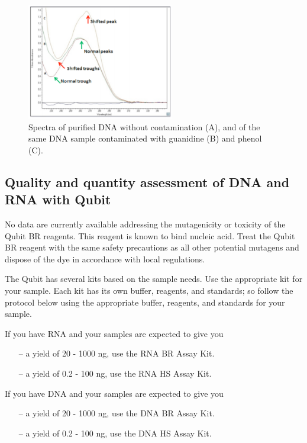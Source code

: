 \documentclass[11pt, oneside]{article}
\begin{document}
	\newpage

		\begin{figure}[h]
			\begin{center}
				\includegraphics[height=2in]{./images/Nanodrop_peaks.pdf}
			\end{center}
			\caption{Spectra of purified DNA without contamination (A), and of the same DNA sample contaminated with guanidine (B) and phenol (C).}
		\end{figure}
	
	\newpage
	
	\subsection{Quality and quantity assessment of DNA and RNA with Qubit}

		\vspace{5mm}
	
	
		\noindent No data are currently available addressing the mutagenicity or toxicity of the Qubit BR reagents. This reagent is known to bind nucleic 		acid. Treat the Qubit BR reagent with the same safety precautions as all other potential mutagens and dispose of the dye in accordance with local 		regulations. 
	
		\vspace{3mm}
	
		\noindent The Qubit has several kits based on the sample needs. Use the appropriate kit for your sample. Each kit has its own buffer, reagents, 		and standards; so follow the protocol below using the appropriate buffer, reagents, and standards for your sample.

		\vspace{3mm}

		\noindent If you have RNA and your samples are expected to give you 
		\begin{itemize}
			\item[--] a yield of 20 - 1000 ng, use the RNA BR Assay Kit. 
			\item[--] a yield of 0.2 - 100 ng, use the RNA HS Assay Kit. 
		\end{itemize}
		\noindent If you have DNA and your samples are expected to give you
		\begin{itemize}
			\item[--] a yield of 20 - 1000 ng, use the DNA BR Assay Kit. 
			\item[--] a yield of 0.2 - 100 ng, use the DNA HS Assay Kit.
		\end{itemize}
		
\end{document}
